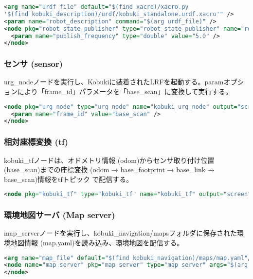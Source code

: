 \begin{lstlisting}[language=XML]
<arg name="urdf_file" default="$(find xacro)/xacro.py
'$(find kobuki_description)/urdf/kobuki_standalone.urdf.xacro'" />
<param name="robot_description" command="$(arg urdf_file)" />
<node pkg="robot_state_publisher" type="robot_state_publisher" name="robot_state_publisher" output="screen">
  <param name="publish_frequency" type="double" value="5.0" />
</node>
\end{lstlisting}

\subsubsection{センサ (sensor)}

urg\_nodeノードを実行し、Kobukiに装着されたLRFを起動する。paramオプションにより「frame\_id」パラメータを「base\_scan」に変換して実行する。

\begin{lstlisting}[language=XML]
<node pkg="urg_node" type="urg_node" name="kobuki_urg_node" output="screen">
  <param name="frame_id" value="base_scan" />
</node>
\end{lstlisting}

\subsubsection{相対座標変換 (tf)}
kobuki\_tfノードは、オドメトリ情報 (odom)からセンサ取り付け位置 (base\_scan)までの座標変換 (odom → base\_footprint → base\_link → base\_scan)情報をtfトピック  で配信する。

\begin{lstlisting}[language=XML]
<node pkg="kobuki_tf" type="kobuki_tf" name="kobuki_tf" output="screen"> </node>
\end{lstlisting}

\subsubsection{環境地図サーバ (Map server)}
map\_serverノードを実行し、kobuki\_navigation/mapsフォルダに保存された環境地図情報 (map.yaml)を読み込み、環境地図を配信する。

\begin{lstlisting}[language=XML]
<arg name="map_file" default="$(find kobuki_navigation)/maps/map.yaml"/>
<node name="map_server" pkg="map_server" type="map_server" args="$(arg map_file)">
</node>
\end{lstlisting}

